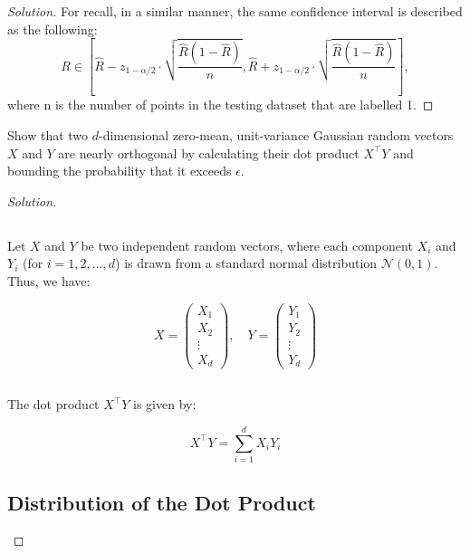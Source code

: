 \documentclass[12pt]{article}
\newenvironment{exercise}[2][Exercise]{\begin{trivlist}
\item[\hskip \labelsep {\bfseries #1}\hskip \labelsep {\bfseries #2.}]}{\end{trivlist}}
\newenvironment{solution}{\begin{proof}[Solution]}{\end{proof}}
\begin{document}
\begin{solution}
For recall, in a similar manner, the same confidence interval is described as the following:
\[
R \in \left[ \hat{R} - z_{1-\alpha/2} \cdot \sqrt{\frac{\hat{R}(1 - \hat{R})}{n}}, \hat{R} + z_{1-\alpha/2} \cdot \sqrt{\frac{\hat{R}(1 - \hat{R})}{n}} \right],
\]
where n is the number of points in the testing dataset that are labelled 1.
\end{solution}

\newpage
\begin{exercise}{3}
    Show that two $d$-dimensional zero-mean, unit-variance Gaussian random vectors $X$ and $Y$ are nearly orthogonal by calculating their dot product $X^\top Y$ and bounding the probability that it exceeds $\epsilon$.
    \end{exercise}
    
    \begin{solution}
    
    \subsection*{}
    
    Let \( X \) and \( Y \) be two independent random vectors, where each component \( X_i \) and \( Y_i \) (for \( i = 1, 2, \ldots, d \)) is drawn from a standard normal distribution \( \mathcal{N}(0, 1) \). Thus, we have:
    
    \[
    X = \begin{pmatrix} X_1 \\ X_2 \\ \vdots \\ X_d \end{pmatrix}, \quad Y = \begin{pmatrix} Y_1 \\ Y_2 \\ \vdots \\ Y_d \end{pmatrix}
    \]
    
    \subsection*{}
    
    The dot product \( X^\top Y \) is given by:
    
    \[
    X^\top Y = \sum_{i=1}^d X_i Y_i
    \]
    
    \subsection*{Distribution of the Dot Product}
    

\end{solution}
\end{document}

